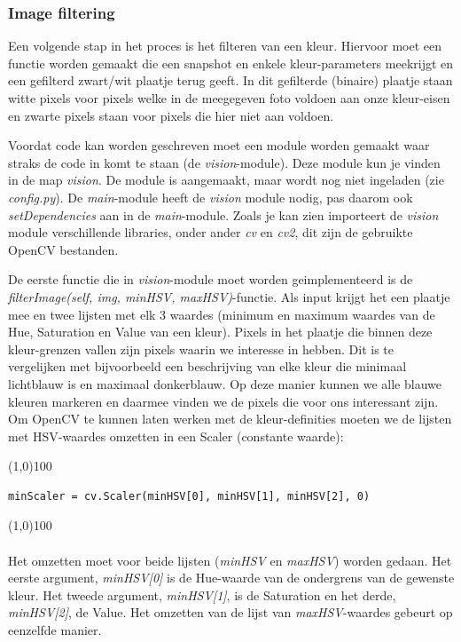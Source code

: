\documentclass[a4paper, twoside]{article}
\begin{document}
\subsubsection{Image filtering}
Een volgende stap in het proces is het filteren van een kleur. Hiervoor moet een functie worden gemaakt die een snapshot en enkele kleur-parameters meekrijgt en een gefilterd zwart/wit plaatje terug geeft. In dit gefilterde (binaire) plaatje staan witte pixels voor pixels welke in de meegegeven foto voldoen aan onze kleur-eisen en zwarte pixels staan voor pixels die hier niet aan voldoen.

Voordat code kan worden geschreven moet een module worden gemaakt waar straks de code in komt te staan (de \textit{vision}-module). Deze module kun je vinden in de map \textit{vision}. De module is aangemaakt, maar wordt nog niet ingeladen (zie \textit{config.py}). De \emph{main}-module heeft de \textit{vision} module nodig, pas daarom ook \textit{setDependencies} aan in de \emph{main}-module.
Zoals je kan zien importeert de \textit{vision} module verschillende libraries, onder ander \textit{cv} en \textit{cv2}, dit zijn de gebruikte OpenCV bestanden.

De eerste functie die in \textit{vision}-module moet worden geimplementeerd is de \textit{filterImage(self, img, minHSV, maxHSV)}-functie.
Als input krijgt het een plaatje mee en twee lijsten met elk 3 waardes (minimum en maximum waardes van de Hue, Saturation en Value van een kleur). Pixels in het plaatje die binnen deze kleur-grenzen vallen zijn pixels waarin we interesse in hebben. Dit is te vergelijken met bijvoorbeeld een beschrijving van elke kleur die minimaal lichtblauw is en maximaal donkerblauw. Op deze manier kunnen we alle blauwe kleuren markeren en daarmee vinden we de pixels die voor ons interessant zijn.
Om OpenCV te kunnen laten werken met de kleur-definities moeten we de lijsten met HSV-waardes omzetten in een Scaler (constante waarde):

\noindent \line(1,0){100}
\begin{verbatim}
minScaler = cv.Scaler(minHSV[0], minHSV[1], minHSV[2], 0)
\end{verbatim}
\noindent \line(1,0){100}
\\\\
Het omzetten moet voor beide lijsten (\textit{minHSV} en \textit{maxHSV}) worden gedaan. Het eerste argument, \textit{minHSV[0]} is de Hue-waarde van de ondergrens van de gewenste kleur. Het tweede argument, \textit{minHSV[1]}, is de Saturation en het derde, \textit{minHSV[2]}, de Value. Het omzetten van de lijst van \textit{maxHSV}-waardes gebeurt op eenzelfde manier.
\end{document}

